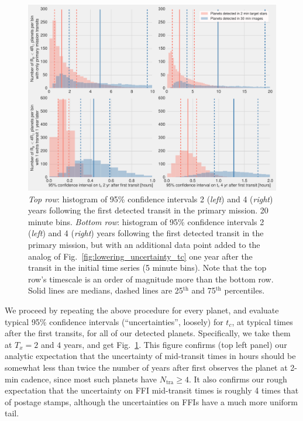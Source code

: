 \begin{figure}[!t]
	\centering
	\includegraphics[scale=1.]{figures/confidence_interval_gets_better.pdf}
	\caption{\textit{Top row}: histogram of 95\% confidence intervals 2 (\textit{left}) and 4 (\textit{right}) years following the first detected transit in the primary mission.
		20 minute bins.
		\textit{Bottom row}: histogram of 95\% confidence intervals 2 (\textit{left}) and 4 (\textit{right}) years following the first detected transit in the primary mission, but with an additional data point added to the analog of Fig.~\protect\ref{fig:lowering_uncertainty_tc} one year after the transit in the initial time series (5 minute bins).
		Note that the top row's timescale is an order of magnitude more than the bottom row.
		Solid lines are medians, dashed lines are 25$^\mathrm{th}$ and 75$^\mathrm{th}$ percentiles.
	} %
	\label{fig:conf_interval_gets_better}
\end{figure}
We proceed by repeating the above procedure for every planet, and evaluate typical 95\% confidence intervals (``uncertainties'', loosely) for $t_c$, at typical times after the first transits, for all of our detected planets.
Specifically, we take them at $T_x=2$ and $4$ years, and get Fig.~\ref{fig:conf_interval_gets_better}.
This figure confirms (top left panel) our analytic expectation that the uncertainty of mid-transit times in hours should be somewhat less than twice the number of years after \tess first observes the planet at 2-min cadence, since most such planets have $N_\mathrm{tra}\geq4$.
It also confirms our rough expectation that the uncertainty on FFI mid-transit times is roughly 4 times that of postage stamps, although the uncertainties on FFIs have a much more uniform tail.

